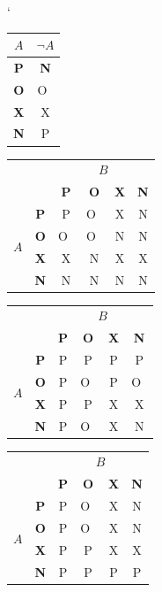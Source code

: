 \documentclass[11pt,a4paper]{article}
\begin{document}
\begin{table}[h]
\begin{center}

\catcode` %
	\begin{tabular}{|c|c|} \hline
	$A$ & $\neg A$ \\ \hline
	\textbf{P} & \textbf{N} \\ \hline
	\textbf{O} & O~\\ \hline
	\textbf{X} & X \\ \hline
	\textbf{N} & P \\ \hline
	\end{tabular}
	\begin{tabular}{|c|c|c|c|c|c|}
        \hline
        \multicolumn{2}{|c|}{ \multirow{2}{*}{$A \wedge B$} } & \multicolumn{4}{|c|}{$B$} \\ \cline{3-6}
        \multicolumn{2}{|c|}{ \multirow{2}{*}{} } & \textbf{P} & \textbf{O} & \textbf{X} & \textbf{N} \\ \hline
        \multirow{4}{*}{$A$}& \textbf{P} & P & O~& X & N \\ \cline{2-6}
        & \textbf{O} & O~& O~& N & N \\ \cline{2-6}
        & \textbf{X} & X & N & X & X \\ \cline{2-6}
        & \textbf{N} & N & N & N & N \\ \hline
\end{tabular} 
	\begin{tabular}{|c|c|c|c|c|c|}
        \hline
        \multicolumn{2}{|c|}{ \multirow{2}{*}{$A \vee B$} } & \multicolumn{4}{|c|}{$B$} \\ \cline{3-6}
        \multicolumn{2}{|c|}{ \multirow{2}{*}{} } & \textbf{P} & \textbf{O} & \textbf{X} & \textbf{N} \\ \hline
        \multirow{4}{*}{$A$}& \textbf{P} & P & P & P & P \\ \cline{2-6}
        & \textbf{O} & P & O~& P & O~\\ \cline{2-6}
        & \textbf{X} & P & P & X & X \\ \cline{2-6}
        & \textbf{N} & P & O~& X & N \\ \hline
\end{tabular}
	\begin{tabular}{|c|c|c|c|c|c|}
        \hline
        \multicolumn{2}{|c|}{ \multirow{2}{*}{$A \rightarrow B$} } & \multicolumn{4}{|c|}{$B$} \\ \cline{3-6}
        \multicolumn{2}{|c|}{ \multirow{2}{*}{} } & \textbf{P} & \textbf{O} & \textbf{X} & \textbf{N} \\ \hline
        \multirow{4}{*}{$A$}& \textbf{P} & P & O~& X & N \\ \cline{2-6}
        & \textbf{O} & P & O~& X & N \\ \cline{2-6}
        & \textbf{X} & P & P & X & X \\ \cline{2-6}
        & \textbf{N} & P & P & P & P \\ \hline
\end{tabular}



\end{center}
\end{table}
\end{document}
